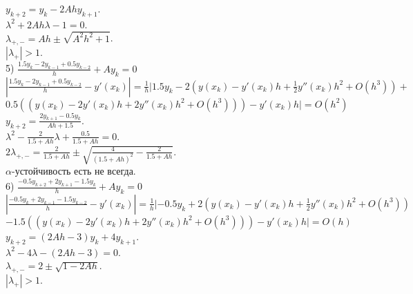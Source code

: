 \documentclass[14pt,a4paper]{extarticle}
\newcommand{\1}{\mathbbm{1}}
\begin{document}
 $y_{k+2} = y_{k} - 2 A h y_{k+1} $.\\
 $\lambda^2 + 2 A h \lambda - 1 = 0$. \\
 $\lambda_{+, -} = A h \pm \sqrt{A^2 h^2 + 1}$. \\
 $|\lambda_{+}| > 1 $. \\
5) $\frac{1.5 y_k-2 y_{k-1}+0.5 y_{k-2}}{h}+A y_k=0$ \\ 
$|\frac{1.5 y_k-2 y_{k-1}+0.5 y_{k-2}}{h} -y'(x_k)| = \frac{1}{h} |1.5 y_k-2(y(x_k) - y'(x_k)h +\frac{1}{2} y''(x_k)h^2 + O(h^3))+$
$0.5 ((y(x_k) - 2 y'(x_k)h +2 y''(x_k)h^2 + O(h^3))) -y'(x_k) h| = O(h^2)$\\
$y_{k+2} = \frac{2 y_{k+1} - 0.5 y_{k}}{A h + 1.5} $.\\
$\lambda^2 - \frac{2}{1.5 + Ah} \lambda + \frac{0.5}{1.5 + Ah} = 0$.\\
$2 \lambda_{+, -} = \frac{2}{1.5 + Ah} \pm \sqrt{\frac{4}{(1.5 + Ah)^2} - \frac{2}{1.5 + Ah} }$. \\
$\alpha$-устойчивость есть не всегда. \\
6) $\frac{-0.5 y_{k+2}+2 y_{k+1}-1.5 y_k}{h}+A y_k=0$ \\ 
$|\frac{-0.5 y_k + 2 y_{k-1} - 1.5 y_{k-2}}{h} -y'(x_k)| = \frac{1}{h} |-0.5 y_k+2(y(x_k) - y'(x_k)h +\frac{1}{2} y''(x_k)h^2 + O(h^3))$
$-1.5 ((y(x_k) - 2 y'(x_k)h +2 y''(x_k)h^2 + O(h^3))) -y'(x_k) h| = O(h)$\\
$y_{k+2} = (2 A h - 3) y_k + 4 y_{k+1}$.\\
$\lambda^2  - 4 \lambda - (2 A h - 3) = 0$.\\
$\lambda_{+, -} = 2 \pm \sqrt{1 - 2 A h}$.\\
$|\lambda_{+}| > 1 $. \\
\end{document}
